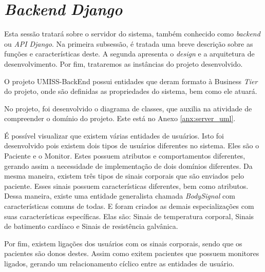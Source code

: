 \section{\textit{Backend} \textit{Django}}
Esta sessão tratará sobre o servidor do sistema, também conhecido como \textit{backend}
ou \textit{API} \textit{Django}. Na primeira subsessão, é tratada uma breve descrição sobre as funções
e características deste. A segunda apresenta o \textit{design} e a arquitetura
de desenvolvimento. Por fim, trataremos as instâncias do projeto desenvolvido.


O projeto UMISS-BackEnd
possui entidades que deram formato à Business
\textit{Tier} do projeto, onde são definidas as propriedades do sistema, bem como ele atuará.

No projeto, foi desenvolvido o diagrama de classes, que auxilia na atividade de compreender
o domínio do projeto. Este está no Anexo \ref{anx:server_uml}.

É possível visualizar que existem várias entidades de usuários. Isto foi desenvolvido pois
existem dois tipos de usuários diferentes no sistema. Eles são o Paciente e o Monitor. Estes
possuem atributos e comportamentos diferentes, gerando assim a necessidade de implementação
de dois domínios diferentes.  Da mesma maneira, existem três tipos de sinais corporais que são enviados pelo paciente.
Esses sinais possuem características diferentes, bem como atributos. Dessa maneira, existe
uma entidade generalista chamada \textit{BodySignal} com características comuns de todas. E
foram criados as demais especializações com suas características  específicas. Elas são:
Sinais de temperatura corporal, Sinais de batimento cardíaco e Sinais de resistência galvânica.

Por fim, existem ligações dos usuários com os sinais corporais, sendo que os pacientes
são donos destes. Assim como exitem pacientes que possuem monitores ligados,
gerando um relacionamento cíclico entre as entidades de usuário.
